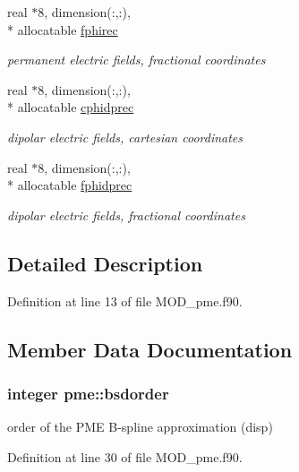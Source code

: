 \begin{DoxyCompactItemize}
real $\ast$8, dimension(\-:,\-:), \\*
allocatable \hyperlink{classpme_a3c1e3e7a8d7e5a22e4c8bed26520f761}{fphirec}
\begin{DoxyCompactList}\small\item\em permanent electric fields, fractional coordinates \end{DoxyCompactList}\item 
real $\ast$8, dimension(\-:,\-:), \\*
allocatable \hyperlink{classpme_a312266776211f48232fff6d6366c1744}{cphidprec}
\begin{DoxyCompactList}\small\item\em dipolar electric fields, cartesian coordinates \end{DoxyCompactList}\item 
real $\ast$8, dimension(\-:,\-:), \\*
allocatable \hyperlink{classpme_a78223e8e44ba3091095218d421ed4c61}{fphidprec}
\begin{DoxyCompactList}\small\item\em dipolar electric fields, fractional coordinates \end{DoxyCompactList}\end{DoxyCompactItemize}


\subsection{Detailed Description}


Definition at line 13 of file M\-O\-D\-\_\-pme.\-f90.



\subsection{Member Data Documentation}
\hypertarget{classpme_a186cf8382a7089c487f26bd6fda0e1a6}{
\subsubsection[{bsdorder}]{\setlength{\rightskip}{0pt plus 5cm}integer pme\-::bsdorder}}\label{classpme_a186cf8382a7089c487f26bd6fda0e1a6}


order of the P\-M\-E B-\/spline approximation (disp) 



Definition at line 30 of file M\-O\-D\-\_\-pme.\-f90.


